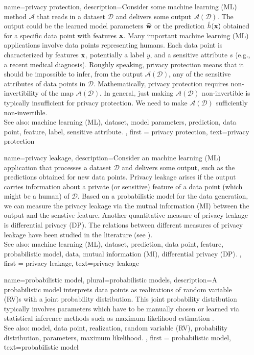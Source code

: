 {name={privacy protection},
     description={Consider some machine learning (ML) method $\mathcal{A}$ that reads 
	 in a dataset $\mathcal{D}$ and delivers some output $\mathcal{A}(\mathcal{D})$. The output 
	 could be the learned model parameters $\widehat{{\bf w}}$ or the prediction 
	 $\hat{h}({\bf x})$ obtained for a specific data point with features 
	 ${\bf x}$. Many important machine learning (ML) applications involve data points 
		representing humans. Each data point is characterized by features ${\bf x}$, 
		potentially a label $y$, and a sensitive attribute $s$ (e.g., a recent medical diagnosis). 
		Roughly speaking, privacy protection means that it should be impossible to infer, from the output $\mathcal{A}(\mathcal{D})$, 
		any of the sensitive attributes of data points in $\mathcal{D}$. Mathematically, privacy protection requires non-invertibility 
		of the map $\mathcal{A}(\mathcal{D})$. In general, just making $\mathcal{A}(\mathcal{D})$ non-invertible 
		is typically insufficient for privacy protection. We need to make $\mathcal{A}(\mathcal{D})$ sufficiently non-invertible. 
					\\ 
		See also: machine learning (ML), dataset, model parameters, prediction, data point, feature, label, sensitive attribute.
	}, 
	first = {privacy protection}, text={privacy protection} 
}

{
	name={privacy leakage},
	description={Consider an machine learning (ML) application that processes a 
	dataset $\mathcal{D}$ and delivers some output, such as the predictions 
	obtained for new data points. Privacy leakage arises 
	if the output carries information about a private (or sensitive) feature of 
	a data point (which might be a human) of $\mathcal{D}$. Based on a probabilistic model 
	for the data generation, we can measure the privacy leakage via the mutual information (MI) 
	between the output and the senstive feature. Another quantitative measure of privacy leakage 
	is differential privacy (DP). The relations between different measures of privacy leakage have been 
	studied in the literature (see \cite{InfThDiffPriv}). 
				\\ 
		See also: machine learning (ML), dataset, prediction, data point, feature, probabilistic model, data, mutual information (MI), differential privacy (DP). 
	}, 
	first = {privacy leakage}, text={privacy leakage} 
}



{
	name={probabilistic model}, plural={probabilistic models},
	description={A probabilistic model interprets data points 
		as realizations of random variable (RV)s with a joint probability distribution. This joint probability distribution typically 
		involves parameters which have to be manually chosen or learned via statistical inference 
		methods such as maximum likelihood estimation \cite{LC}.
					\\ 
		See also: model, data point, realization, random variable (RV), probability distribution, parameters, maximum likelihood. }, 
	first = {probabilistic model}, text={probabilistic model} 
}



